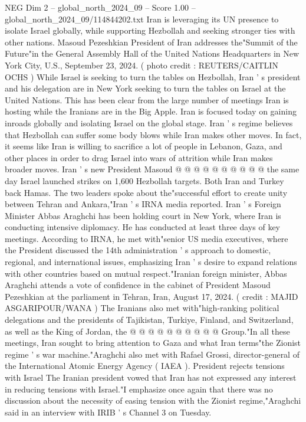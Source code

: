 \begin{textsample}{NEG Dim 2 – global\_north\_2024\_09 – Score 1.00 – global\_north\_2024\_09/114844202.txt}  \label{ex:f2_neg_037}
Iran is leveraging its UN presence to isolate Israel globally, while supporting Hezbollah and seeking stronger ties with other nations.
Masoud Pezeshkian President of Iran addresses the"Summit of the Future"in the General Assembly Hall of the United Nations Headquarters in New York City, U.S., September 23, 2024. ( photo credit : REUTERS/CAITLIN OCHS ) While Israel is seeking to turn the tables on Hezbollah, Iran ' s president and his delegation are in New York seeking to turn the tables on Israel at the United Nations.
This has been clear from the large number of meetings Iran is hosting while the Iranians are in the Big Apple.
Iran is focused today on gaining inroads globally and isolating Israel on the global stage.
Iran ' s regime believes that Hezbollah can suffer some body blows while Iran makes other moves.
In fact, it seems like Iran is willing to sacrifice a lot of people in Lebanon, Gaza, and other places in order to drag Israel into wars of attrition while Iran makes broader moves.
Iran ' s new President Masoud @ @ @ @ @ @ @ @ @ @ the same day Israel launched strikes on 1,600 Hezbollah targets.
Both Iran and Turkey back Hamas.
The two leaders spoke about the"successful effort to create unity between Tehran and Ankara,"Iran ' s IRNA media reported.
Iran ' s Foreign Minister Abbas Araghchi has been holding court in New York, where Iran is conducting intensive diplomacy.
He has conducted at least three days of key meetings.
According to IRNA, he met with"senior US media executives, where the President discussed the 14th administration ' s approach to domestic, regional, and international issues, emphasizing Iran ' s desire to expand relations with other countries based on mutual respect."Iranian foreign minister, Abbas Araghchi attends a vote of confidence in the cabinet of President Masoud Pezeshkian at the parliament in Tehran, Iran, August 17, 2024. ( credit : MAJID ASGARIPOUR/WANA ) The Iranians also met with"high-ranking political delegations and the presidents of Tajikistan, Turkiye, Finland, and Switzerland, as well as the King of Jordan, the @ @ @ @ @ @ @ @ @ @ Group."In all these meetings, Iran sought to bring attention to Gaza and what Iran terms"the Zionist regime ' s war machine."Araghchi also met with Rafael Grossi, director-general of the International Atomic Energy Agency ( IAEA ).
President rejects tensions with Israel The Iranian president vowed that Iran has not expressed any interest in reducing tensions with Israel."I emphasize once again that there was no discussion about the necessity of easing tension with the Zionist regime,"Araghchi said in an interview with IRIB ' s Channel 3 on Tuesday.

\end{textsample}
